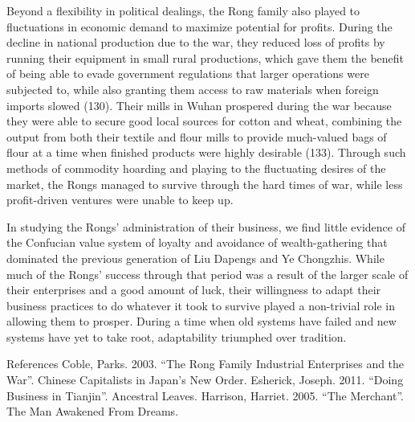 Beyond a flexibility in political dealings, the Rong
family also played to fluctuations in economic
demand to maximize potential for profits. During the
decline in national production due to the war, they
reduced  loss of profits by running their equipment
in small rural productions, which gave them the
benefit of being able to evade government
regulations that larger operations were subjected
to, while also granting them access to raw materials
when foreign imports slowed (130). Their mills in
Wuhan prospered during the war because they were
able to secure good local sources for cotton and
wheat, combining the output from both their textile
and flour mills to provide much-valued bags of flour
at a time when finished products were highly
desirable (133). Through such methods of commodity
hoarding and playing to the fluctuating desires of
the market, the Rongs managed to survive through the
hard times of war, while less profit-driven ventures
were unable to keep up.

In studying the Rongs' administration of their
business, we find little evidence of the
Confucian value system of loyalty and avoidance
of wealth-gathering that dominated the previous
generation of Liu Dapengs and Ye Chongzhis.
While much of the Rongs' success through that
period was a result of the larger scale of their
enterprises and a good amount of luck, their
willingness to adapt their business practices to
do whatever it took to survive played a
non-trivial role in allowing them to prosper.
During a time when old systems have failed and
new systems have yet to take root, adaptability
triumphed over tradition.

References
Coble, Parks. 2003. “The Rong Family Industrial Enterprises and the War”. Chinese Capitalists in Japan's New Order.
Esherick, Joseph. 2011. “Doing Business in Tianjin”. Ancestral Leaves.
Harrison, Harriet. 2005. “The Merchant”. The Man Awakened From Dreams.


